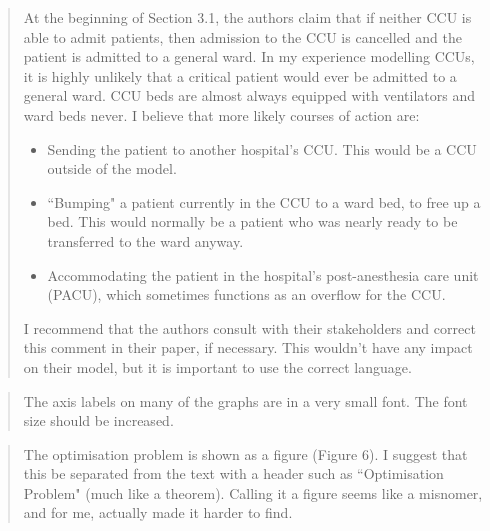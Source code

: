 \documentclass{article}
\begin{document}
\begin{quote}
    \begin{textit}
        {
        At the beginning of Section 3.1, the authors claim that if neither CCU
        is able to admit patients, then admission to the CCU is cancelled and
        the patient is admitted to a general ward. In my experience modelling
        CCUs, it is highly unlikely that a critical patient would ever be
        admitted to a general ward.  CCU beds are almost always equipped with
        ventilators and ward beds never. I believe that more likely courses of
        action are:
        \begin{itemize}
         \item Sending the patient to another hospital's CCU.  This would be a CCU
           outside of the model.
         \item ``Bumping" a patient currently in the CCU to a ward bed, to free up
           a bed. This would normally be a patient who was nearly ready to be
           transferred to the ward anyway.
         \item Accommodating the patient in the hospital's post-anesthesia care
           unit (PACU), which sometimes functions as an overflow for the CCU.
        \end{itemize}
        I recommend that the authors consult with their stakeholders and
        correct this comment in their paper, if necessary.  This wouldn't have
        any impact on their model, but it is important to use the correct
        language.
        }
    \end{textit}
\end{quote}

\begin{quote}
    \begin{textit}
        {
        The axis labels on many of the graphs are in a very small font. The
        font size should be increased.
        }
    \end{textit}
\end{quote}

\begin{quote}
    \begin{textit}
        {
        The optimisation problem is shown as a figure (Figure 6). I suggest
        that this be separated from the text with a header such as
        ``Optimisation Problem" (much like a theorem).  Calling it a figure
        seems like a misnomer, and for me, actually made it harder to find.
        }
    \end{textit}
\end{quote}
\end{document}
